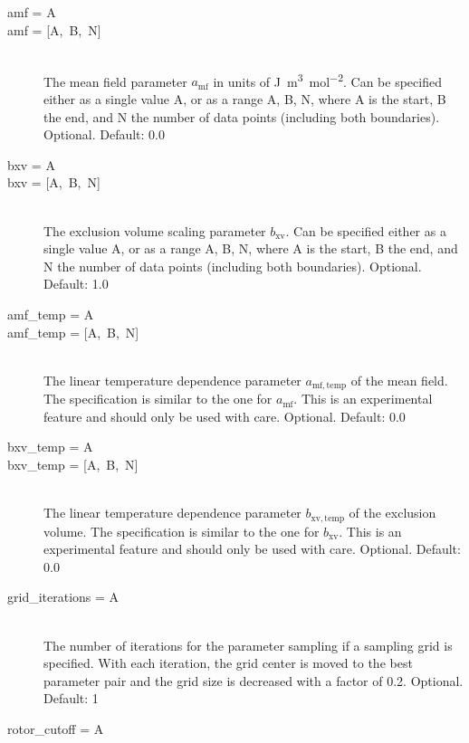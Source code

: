 \documentclass{scrartcl}
\newcommand{\amf}{a_\mathrm{mf}}
\newcommand{\bxv}{b_\mathrm{xv}}
\begin{document}
\begin{description}
    \item[amf = A]
    \item[amf = \mbox{[A, B, N]}] \hfill \\
        The mean field parameter $\amf$ in units of \si{\joule\cubic\meter\per\mole\squared}.
        Can be specified either as a single value A, or as a range A, B, N, where A is the start, B the end, 
        and N the number of data points (including both boundaries).
        Optional. Default: 0.0
        \vspace{0.1cm}
    \item[bxv = A]
    \item[bxv = \mbox{[A, B, N]}] \hfill \\
        The exclusion volume scaling parameter $\bxv$.
        Can be specified either as a single value A, or as a range A, B, N, where A is the start, B the end, 
        and N the number of data points (including both boundaries).
        Optional. Default: 1.0
        \vspace{0.1cm}
    \item[amf\_temp = A]
    \item[amf\_temp = \mbox{[A, B, N]}] \hfill \\
        The linear temperature dependence parameter $a_\mathrm{mf,temp}$ of the mean field.
        The specification is similar to the one for $\amf$.
        This is an experimental feature and should only be used with care.
        Optional. Default: 0.0
        \vspace{0.1cm}
    \item[bxv\_temp = A]
    \item[bxv\_temp = \mbox{[A, B, N]}] \hfill \\
        The linear temperature dependence parameter $b_\mathrm{xv,temp}$ of the exclusion volume.
        The specification is similar to the one for $\bxv$.
        This is an experimental feature and should only be used with care.
        Optional. Default: 0.0
        \vspace{0.1cm}
    \item[grid\_iterations = A] \hfill \\
        The number of iterations for the parameter sampling if a sampling grid is specified.
        With each iteration, the grid center is moved to the best parameter pair and the grid size is decreased 
        with a factor of 0.2.
        Optional. Default: 1
    \item[rotor\_cutoff = A] \hfill \\

\end{description}
\end{document}
